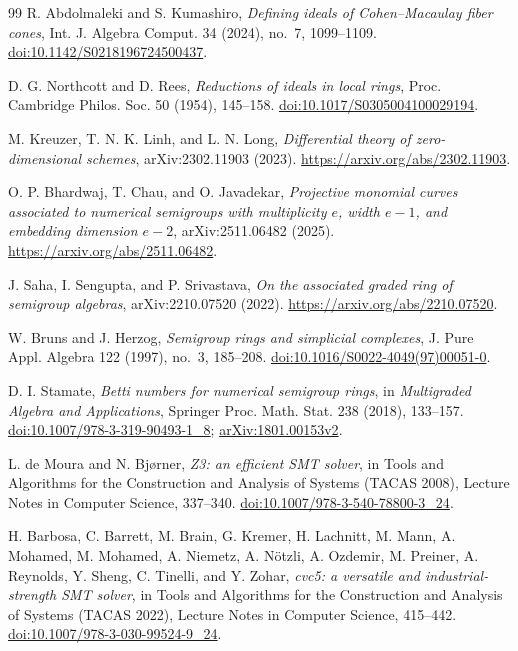 \documentclass[11pt]{article}
\theoremstyle{definition}
\theoremstyle{remark}
\begin{document}
{\begin{thebibliography}{99}
R. Abdolmaleki and S. Kumashiro,
\emph{Defining ideals of Cohen--Macaulay fiber cones},
Int. J. Algebra Comput. 34 (2024), no.~7, 1099--1109.
\href{https://doi.org/10.1142/S0218196724500437}{doi:10.1142/S0218196724500437}.

D. G. Northcott and D. Rees,
\emph{Reductions of ideals in local rings},
Proc. Cambridge Philos. Soc. 50 (1954), 145--158.
\href{https://doi.org/10.1017/S0305004100029194}{doi:10.1017/S0305004100029194}.

M. Kreuzer, T. N. K. Linh, and L. N. Long,
\emph{Differential theory of zero-dimensional schemes}, arXiv:2302.11903 (2023).
\url{https://arxiv.org/abs/2302.11903}.

O. P. Bhardwaj, T. Chau, and O. Javadekar,
\emph{Projective monomial curves associated to numerical semigroups with multiplicity $e$,
width $e-1$, and embedding dimension $e-2$}, arXiv:2511.06482 (2025).
\url{https://arxiv.org/abs/2511.06482}.

J. Saha, I. Sengupta, and P. Srivastava,
\emph{On the associated graded ring of semigroup algebras}, arXiv:2210.07520 (2022).
\url{https://arxiv.org/abs/2210.07520}.

W. Bruns and J. Herzog,
\emph{Semigroup rings and simplicial complexes},
J. Pure Appl. Algebra 122 (1997), no.~3, 185--208.
\href{https://doi.org/10.1016/S0022-4049(97)00051-0}{doi:10.1016/S0022-4049(97)00051-0}.

D. I. Stamate,
\emph{Betti numbers for numerical semigroup rings},
in \emph{Multigraded Algebra and Applications}, Springer Proc. Math. Stat. 238 (2018), 133--157.
\href{https://doi.org/10.1007/978-3-319-90493-1_8}{doi:10.1007/978-3-319-90493-1\_8};
\href{https://arxiv.org/abs/1801.00153}{arXiv:1801.00153v2}.

L. de Moura and N. Bj{\o}rner,
\emph{Z3: an efficient SMT solver},
in Tools and Algorithms for the Construction and Analysis of Systems (TACAS 2008),
Lecture Notes in Computer Science, 337--340.
\href{https://doi.org/10.1007/978-3-540-78800-3_24}{doi:10.1007/978-3-540-78800-3\_24}.

H. Barbosa, C. Barrett, M. Brain, G. Kremer, H. Lachnitt, M. Mann, A. Mohamed, M. Mohamed,
A. Niemetz, A. N\"otzli, A. Ozdemir, M. Preiner, A. Reynolds, Y. Sheng, C. Tinelli, and Y. Zohar,
\emph{cvc5: a versatile and industrial-strength SMT solver},
in Tools and Algorithms for the Construction and Analysis of Systems (TACAS 2022),
Lecture Notes in Computer Science, 415--442.
\href{https://doi.org/10.1007/978-3-030-99524-9_24}{doi:10.1007/978-3-030-99524-9\_24}.

\end{thebibliography}
}
\end{document}
